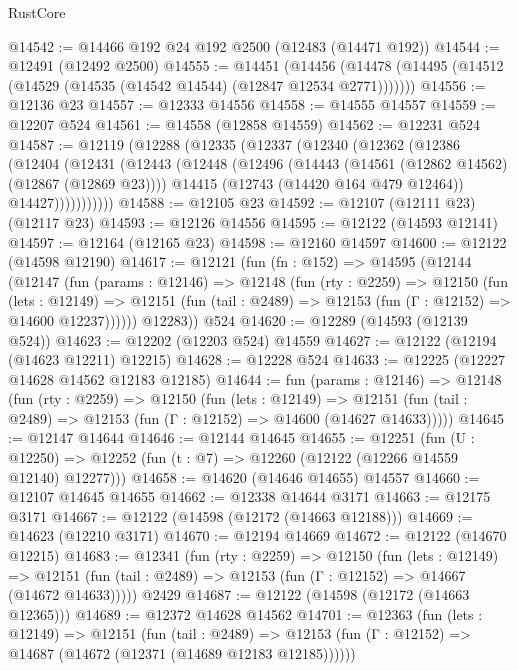 \begin{lexlean}{RustCore}
\begin{coremodule}
@14542 := @14466 @192 @24 @192 @2500 (@12483 (@14471 @192))
@14544 := @12491 (@12492 @2500)
@14555 := @14451
    (@14456 (@14478 (@14495 (@14512 (@14529 (@14535 (@14542 @14544) (@12847 @12534 @2771)))))))
@14556 := @12136 @23
@14557 := @12333 @14556
@14558 := @14555 @14557
@14559 := @12207 @524
@14561 := @14558 (@12858 @14559)
@14562 := @12231 @524
@14587 := @12119
    (@12288
      (@12335
        (@12337
          (@12340
            (@12362
              (@12386
                (@12404
                  (@12431
                    (@12443
                      (@12448
                        (@12496
                          (@14443 (@14561 (@12862 @14562) (@12867 (@12869 @23))))
                          @14415
                          (@12743 (@14420 @164 @479 @12464))
                          @14427)))))))))))
@14588 := @12105 @23
@14592 := @12107 (@12111 @23) (@12117 @23)
@14593 := @12126 @14556
@14595 := @12122 (@14593 @12141)
@14597 := @12164 (@12165 @23)
@14598 := @12160 @14597
@14600 := @12122 (@14598 @12190)
@14617 := @12121
    (fun (fn : @152) =>
    @14595
      (@12144
        (@12147
          (fun (params : @12146) =>
          @12148
            (fun (rty : @2259) =>
            @12150
              (fun (lets : @12149) =>
              @12151 (fun (tail : @2489) => @12153 (fun (Γ : @12152) => @14600 @12237))))))
        @12283))
    @524
@14620 := @12289 (@14593 (@12139 @524))
@14623 := @12202 (@12203 @524) @14559
@14627 := @12122 (@12194 (@14623 @12211) @12215)
@14628 := @12228 @524
@14633 := @12225 (@12227 @14628 @14562 @12183 @12185)
@14644 := fun (params : @12146) =>
  @12148
    (fun (rty : @2259) =>
    @12150
      (fun (lets : @12149) =>
      @12151 (fun (tail : @2489) => @12153 (fun (Γ : @12152) => @14600 (@14627 @14633)))))
@14645 := @12147 @14644
@14646 := @12144 @14645
@14655 := @12251
    (fun (U : @12250) => @12252 (fun (t : @7) => @12260 (@12122 (@12266 @14559 @12140) @12277)))
@14658 := @14620 (@14646 @14655) @14557
@14660 := @12107 @14645 @14655
@14662 := @12338 @14644 @3171
@14663 := @12175 @3171
@14667 := @12122 (@14598 (@12172 (@14663 @12188)))
@14669 := @14623 (@12210 @3171)
@14670 := @12194 @14669
@14672 := @12122 (@14670 @12215)
@14683 := @12341
    (fun (rty : @2259) =>
    @12150
      (fun (lets : @12149) =>
      @12151 (fun (tail : @2489) => @12153 (fun (Γ : @12152) => @14667 (@14672 @14633)))))
    @2429
@14687 := @12122 (@14598 (@12172 (@14663 @12365)))
@14689 := @12372 @14628 @14562
@14701 := @12363
    (fun (lets : @12149) =>
    @12151
      (fun (tail : @2489) =>
      @12153 (fun (Γ : @12152) => @14687 (@14672 (@12371 (@14689 @12183 @12185))))))

\end{coremodule}
\end{lexlean}
